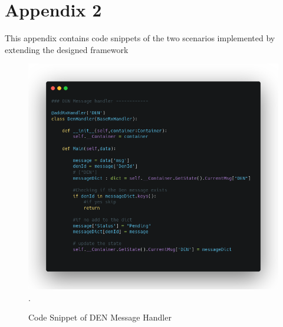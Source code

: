 \chapter*{Appendix 2}
This appendix contains code snippets of the two scenarios implemented by extending the designed framework

\begin{figure}[h!]
    \centering
    \includegraphics[width=12cm]{Framework/Images/denMH.png}.
    \caption{Code Snippet of DEN Message Handler}
\end{figure}

